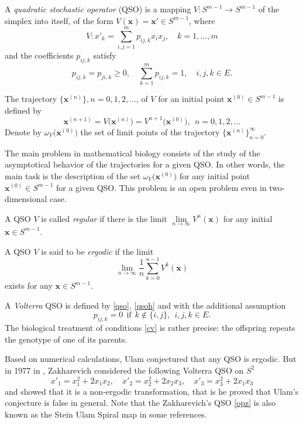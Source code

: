 \documentclass[11pt,reqno]{amsart}
\numberwithin{equation}{section} \setcounter{tocdepth}{1}
\begin{document}
A \emph{quadratic stochastic operator} (QSO) is a mapping $V \colon S^{m-1}\to S^{m-1}$ of the simplex
into itself, of the form $V(\mathbf{x})=\mathbf{x}'\in S^{m-1}$, where
\begin{equation}\label{qso}
V: x'_k=\sum_{i,j=1}^m p_{ij,k}x_ix_j, \quad k=1,\dots,m
\end{equation}
and the coefficients $p_{ij,k}$ satisfy
\begin{equation}\label{qsoh}
p_{ij,k}=p_{ji,k}\geq0, \quad  \sum_{k=1}^m p_{ij,k}=1, \quad i,j,k\in E.
\end{equation}



The trajectory $\{\mathbf{x}^{(n)}\}, n = 0,1,2,\dots$, of $V$ for an initial point $\mathbf{x}^{(0)}\in S^{m-1}$
is defined by
\[\mathbf{x}^{(n+1)} = V \big(\mathbf{x}^{(n)}\big)= V^{n+1}\big(\mathbf{x}^{(0)}\big), \ \ n = 0,1,2,\dots\]
Denote by $\omega_V \big(\mathbf{x}^{(0)}\big)$ the set of limit points of the trajectory $\{\mathbf{x}^{(n)}\}_{n = 0}^\infty$.

The main problem in mathematical biology consists of the study of the asymptotical
behavior of the trajectories for a given QSO. In other words, the main task is the description
of the set $\omega_V \big(\mathbf{x}^{(0)}\big)$ for any initial point $\mathbf{x}^{(0)}\in S^{m-1}$ for a given QSO. This problem
is an open problem even in two-dimensional case.

A QSO $V$ is called \emph{regular} if there is the limit $\lim\limits_{n\rightarrow\infty} V^n(\mathbf{x})$
 for any initial $\mathbf{x}\in S^{m-1}$.

A QSO $V$ is said to be \emph{ergodic} if the limit
\[\lim\limits_{n\rightarrow\infty} \frac{1}{n} \sum_{k=0}^{n-1} V^k(\mathbf{x})\]
exists for any $\mathbf{x}\in S^{m-1}$.

A \emph{Volterra} QSO is defined by \eqref{qso}, \eqref{qsoh} and with the additional
assumption
\begin{equation}\label{cv}
p_{ij,k} = 0 \ \ \text{if} \ \  k\notin \{i,j\},  \ \ i,j,k \in E.
\end{equation}
The biological treatment of conditions \eqref{cv} is rather precise: the offspring repeats the
genotype of one of its parents.

 Based on numerical calculations, Ulam conjectured that any QSO is ergodic\cite{U}.
 But in 1977 in \cite{Zus}, Zakharevich considered the following  Volterra QSO on $S^2$
\begin{equation}\label{opz}
x'_1=x_1^2+2x_1x_2, \quad x'_2=x_2^2+2x_2x_3, \quad x'_3=x_3^2+2x_1x_3
\end{equation}
and showed that it is a non-ergodic transformation, that is he proved that Ulam's conjecture
is false in general. Note that the Zakharevich's QSO \eqref{opz}  is also known as
the Stein Ulam Spiral map in some references.
\end{document}
